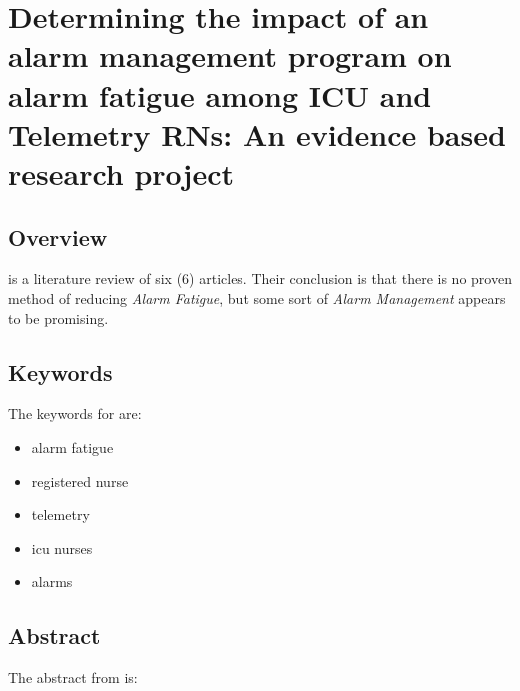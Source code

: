 \chapter{Determining the impact of an alarm management program on alarm fatigue among ICU and Telemetry RNs: An evidence based research project}

\section{Overview}

\citet{dee2022determining} is a literature review of six (6) articles. Their conclusion is that there is no proven method of reducing \textit{Alarm Fatigue}, but some sort of \textit{Alarm Management} appears to be promising.

\section{Keywords}

The keywords for \citet{dee2022determining} are:

\begin{itemize}
	\item alarm fatigue
	\item registered nurse
	\item telemetry
	\item icu nurses
	\item alarms
\end{itemize}

\section{Abstract}

The abstract from \citet{dee2022determining} is:

